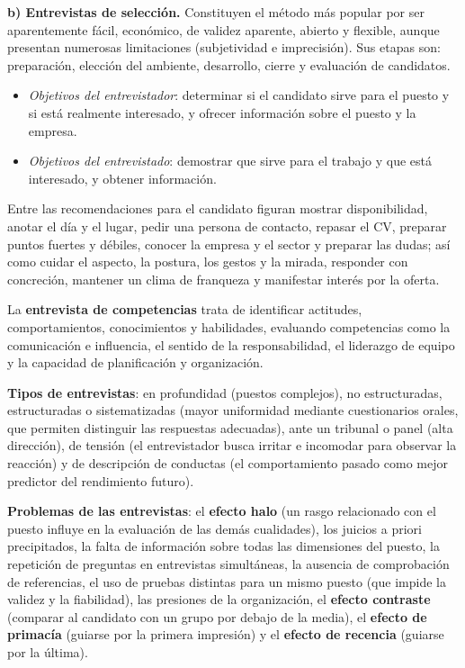 \documentclass[12pt]{book} %
\providecommand{\tightlist}{%
  \setlength{\itemsep}{0pt}\setlength{\parskip}{0pt}}
\begin{document}
\textbf{b) Entrevistas de selección.} Constituyen el método más popular
por ser aparentemente fácil, económico, de validez aparente, abierto y
flexible, aunque presentan numerosas limitaciones (subjetividad e
imprecisión). Sus etapas son: preparación, elección del ambiente,
desarrollo, cierre y evaluación de candidatos.

\begin{itemize}
\tightlist
\item
  \emph{Objetivos del entrevistador}: determinar si el candidato sirve
  para el puesto y si está realmente interesado, y ofrecer información
  sobre el puesto y la empresa.
\item
  \emph{Objetivos del entrevistado}: demostrar que sirve para el trabajo
  y que está interesado, y obtener información.
\end{itemize}

Entre las recomendaciones para el candidato figuran mostrar
disponibilidad, anotar el día y el lugar, pedir una persona de contacto,
repasar el CV, preparar puntos fuertes y débiles, conocer la empresa y
el sector y preparar las dudas; así como cuidar el aspecto, la postura,
los gestos y la mirada, responder con concreción, mantener un clima de
franqueza y manifestar interés por la oferta.

La \textbf{entrevista de competencias} trata de identificar actitudes,
comportamientos, conocimientos y habilidades, evaluando competencias
como la comunicación e influencia, el sentido de la responsabilidad, el
liderazgo de equipo y la capacidad de planificación y organización.

\textbf{Tipos de entrevistas}: en profundidad (puestos complejos), no
estructuradas, estructuradas o sistematizadas (mayor uniformidad
mediante cuestionarios orales, que permiten distinguir las respuestas
adecuadas), ante un tribunal o panel (alta dirección), de tensión (el
entrevistador busca irritar e incomodar para observar la reacción) y de
descripción de conductas (el comportamiento pasado como mejor predictor
del rendimiento futuro).

\textbf{Problemas de las entrevistas}: el \textbf{efecto halo} (un rasgo
relacionado con el puesto influye en la evaluación de las demás
cualidades), los juicios a priori precipitados, la falta de información
sobre todas las dimensiones del puesto, la repetición de preguntas en
entrevistas simultáneas, la ausencia de comprobación de referencias, el
uso de pruebas distintas para un mismo puesto (que impide la validez y
la fiabilidad), las presiones de la organización, el \textbf{efecto
contraste} (comparar al candidato con un grupo por debajo de la media),
el \textbf{efecto de primacía} (guiarse por la primera impresión) y el
\textbf{efecto de recencia} (guiarse por la última).
\end{document}
